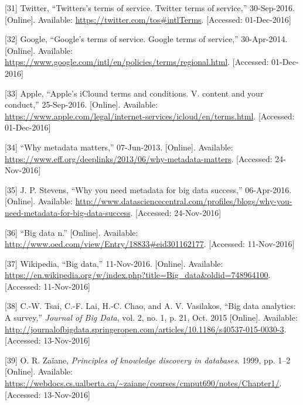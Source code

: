 \documentclass[12pt,english,a4paper,titlepage,cleardoublepage=empty,dottedtoc]{report}
\begin{document}
\hypertarget{ref-web_2016_twitter_terms-of-service}{}
{[}31{]} Twitter, ``Twitters's terms of service. Twitter terms of
service,'' 30-Sep-2016. {[}Online{]}. Available:
\url{https://twitter.com/tos\#intlTerms}. {[}Accessed: 01-Dec-2016{]}

\hypertarget{ref-web_2016_google_terms-of-service}{}
{[}32{]} Google, ``Google's terms of service. Google terms of service,''
30-Apr-2014. {[}Online{]}. Available:
\url{https://www.google.com/intl/en/policies/terms/regional.html}.
{[}Accessed: 01-Dec-2016{]}

\hypertarget{ref-web_2016_apple-icloud_terms-of-service}{}
{[}33{]} Apple, ``Apple's iClound terms and conditions. V. content and
your conduct,'' 25-Sep-2016. {[}Online{]}. Available:
\url{https://www.apple.com/legal/internet-services/icloud/en/terms.html}.
{[}Accessed: 01-Dec-2016{]}

\hypertarget{ref-web_2013_why-metadata-matters}{}
{[}34{]} ``Why metadata matters,'' 07-Jun-2013. {[}Online{]}. Available:
\url{https://www.eff.org/deeplinks/2013/06/why-metadata-matters}.
{[}Accessed: 24-Nov-2016{]}

\hypertarget{ref-web_2016_why-you-need-metadata-for-big-data-to-success}{}
{[}35{]} J. P. Stevens, ``Why you need metadata for big data success,''
06-Apr-2016. {[}Online{]}. Available:
\url{http://www.datasciencecentral.com/profiles/blogs/why-you-need-metadata-for-big-data-success}.
{[}Accessed: 24-Nov-2016{]}

\hypertarget{ref-web_2016_oxford_definition_big-data}{}
{[}36{]} ``Big data n.'' {[}Online{]}. Available:
\url{http://www.oed.com/view/Entry/18833\#eid301162177}. {[}Accessed:
11-Nov-2016{]}

\hypertarget{ref-web_2016_wikipedia_definition_big-data}{}
{[}37{]} Wikipedia, ``Big data,'' 11-Nov-2016. {[}Online{]}. Available:
\url{https://en.wikipedia.org/w/index.php?title=Big_data\&oldid=748964100}.
{[}Accessed: 11-Nov-2016{]}

\hypertarget{ref-paper_2015_big-data-analytics_a-survey}{}
{[}38{]} C.-W. Tsai, C.-F. Lai, H.-C. Chao, and A. V. Vasilakos, ``Big
data analytics: A survey,'' \emph{Journal of Big Data}, vol. 2, no. 1,
p. 21, Oct. 2015 {[}Online{]}. Available:
\url{http://journalofbigdata.springeropen.com/articles/10.1186/s40537-015-0030-3}.
{[}Accessed: 13-Nov-2016{]}

\hypertarget{ref-book-chapter_1999_Principles-of-knowledge-discovery-in-databases_introduction-to-data-mining}{}
{[}39{]} O. R. Zaïane, \emph{Principles of knowledge discovery in
databases}. 1999, pp. 1--2 {[}Online{]}. Available:
\url{https://webdocs.cs.ualberta.ca/~zaiane/courses/cmput690/notes/Chapter1/}.
{[}Accessed: 13-Nov-2016{]}
\end{document}
